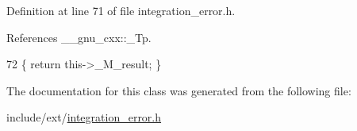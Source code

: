 Definition at line 71 of file integration\+\_\+error.\+h.



References \+\_\+\+\_\+gnu\+\_\+cxx\+::\+\_\+\+Tp.


\begin{DoxyCode}
72       \{ \textcolor{keywordflow}{return} this->\_M\_result; \}
\end{DoxyCode}


The documentation for this class was generated from the following file\+:\begin{DoxyCompactItemize}
\item 
include/ext/\hyperlink{integration__error_8h}{integration\+\_\+error.\+h}\end{DoxyCompactItemize}
